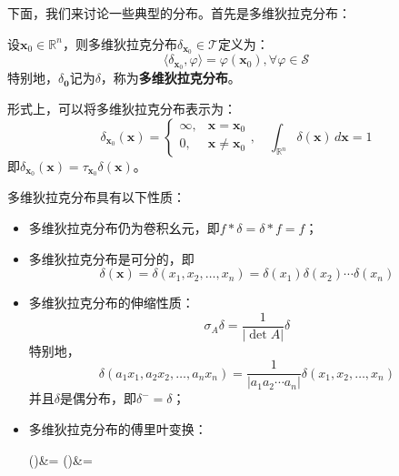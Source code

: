 下面，我们来讨论一些典型的分布。首先是多维狄拉克分布：
\begin{definition}[多维狄拉克分布]
    设$\mathbf{x}_0\in\mathbb{R}^n$，则多维狄拉克分布$\delta_{\mathbf{x}_0}\in\mathcal{T} $定义为：
    \[\langle \delta_{\mathbf{x}_0},\varphi\rangle=\varphi(\mathbf{x}_0),\forall \varphi\in\mathcal{S} \]
    特别地，$\delta_{\mathbf{0}}$记为$\delta$，称为\textbf{多维狄拉克分布}。

    形式上，可以将多维狄拉克分布表示为：
    \[\delta_{\mathbf{x}_0}(\mathbf{x})=\begin{cases}
    \infty,&\mathbf{x}=\mathbf{x}_0\\
    0,&\mathbf{x}\neq \mathbf{x}_0
    \end{cases},\quad \int_{\mathbb{R}^n}\delta(\mathbf{x})\,d\mathbf{x}=1\]
    即$\delta_{\mathbf{x}_0}(\mathbf{x})=\tau_{\mathbf{x}_0}\delta(\mathbf{x})$。
\end{definition}
\begin{proposition}[多维狄拉克分布的性质]
    多维狄拉克分布具有以下性质：
    \begin{itemize}
        \item 多维狄拉克分布仍为卷积幺元，即$f*\delta=\delta*f=f$；
        \item 多维狄拉克分布是可分的，即
        \[\delta(\mathbf{x})=\delta(x_1,x_2,\ldots,x_n)=\delta(x_1)\delta(x_2)\cdots \delta(x_n)\]
        \item 多维狄拉克分布的伸缩性质：
        \[\sigma_A \delta=\frac{1}{|\det A|}\delta\]
        特别地，\[\delta(a_1 x_1,a_2 x_2,\ldots,a_n x_n)=\frac{1}{|a_1 a_2 \cdots a_n|}\delta(x_1,x_2,\ldots,x_n)\]
        并且$\delta$是偶分布，即$\delta^-=\delta$；
        \item 多维狄拉克分布的傅里叶变换：
        \begin{lralign}
         \delta(\boldsymbol{\xi})&=
\switch
         \delta(\boldsymbol{\omega})&=
        \end{lralign}
    \end{itemize}
\end{proposition}
